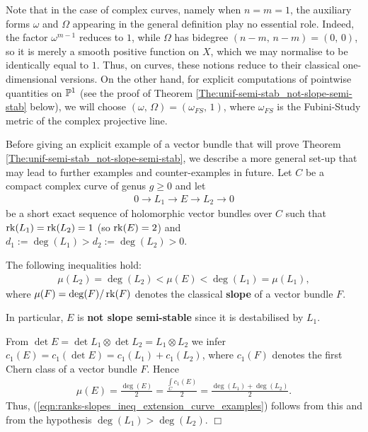 \documentclass[12pt]{article}
\begin{document}
Note that in the case of complex curves, namely when $n=m=1$, the auxiliary forms $\omega$ and $\Omega$ appearing in the general definition play no essential role. Indeed, the factor $\omega^{m-1}$ reduces to $1$, while $\Omega$ has bidegree $(n-m,\,n-m) = (0,\,0)$, so it is merely a smooth positive function on $X$, which we may normalise to be identically equal to $1$. Thus, on curves, these notions reduce to their classical one-dimensional versions. On the other hand, for explicit computations of pointwise quantities on $\mathbb{P}^1$ (see the proof of Theorem \ref{The:unif-semi-stab_not-slope-semi-stab} below), we will choose $(\omega,\,\Omega) = (\omega_{FS},\,1)$, where $\omega_{FS}$ is the Fubini-Study metric of the complex projective line.  

\vspace{2ex}
 
Before giving an explicit example of a vector bundle that will prove Theorem \ref{The:unif-semi-stab_not-slope-semi-stab}, we describe a more general set-up that may lead to further examples and counter-examples in future. Let $C$ be a compact complex curve of genus $g\geq 0$ and let \begin{eqnarray}\label{eqn:extension_curve_examples}0\longrightarrow L_1\longrightarrow E \longrightarrow L_2\longrightarrow 0\end{eqnarray} be a short exact sequence of holomorphic vector bundles over $C$ such that $\operatorname{rk}(L_1) = \operatorname{rk}(L_2) = 1$ (so $\operatorname{rk}(E) = 2$) and $d_1:=\deg (L_1)> d_2:=\deg (L_2) > 0$.

\begin{Obs}\label{Obs:example_not-slope-semi-stable} The following inequalities hold: \begin{eqnarray}\label{eqn:ranks-slopes_ineq_extension_curve_examples}\mu (L_2) = \deg (L_2)<\mu (E) < \deg (L_1) = \mu (L_1),\end{eqnarray} where $\mu(F)=\deg (F)/\operatorname{rk} (F)$ denotes the classical {\bf slope} of a vector bundle $F$.

    In particular, $E$ is {\bf not slope semi-stable} since it is destabilised by $L_1$.   

\end{Obs}

 From $\det E = \det L_1\otimes\det L_2 =  L_1\otimes L_2$ we infer $c_1(E) = c_1(\det E) = c_1(L_1) + c_1(L_2)$, where $c_1(F)$ denotes the first Chern class of a vector bundle $F$. Hence \begin{eqnarray*}\mu (E) = \frac{\deg (E)}{2} = \frac{\int\limits_C c_1(E)}{2} = \frac{\deg (L_1) + \deg (L_2)}{2}.\end{eqnarray*} Thus, (\ref{eqn:ranks-slopes_ineq_extension_curve_examples}) follows from this and from the hypothesis $\deg (L_1)> \deg (L_2)$. \hfill $\Box$
\end{document}
